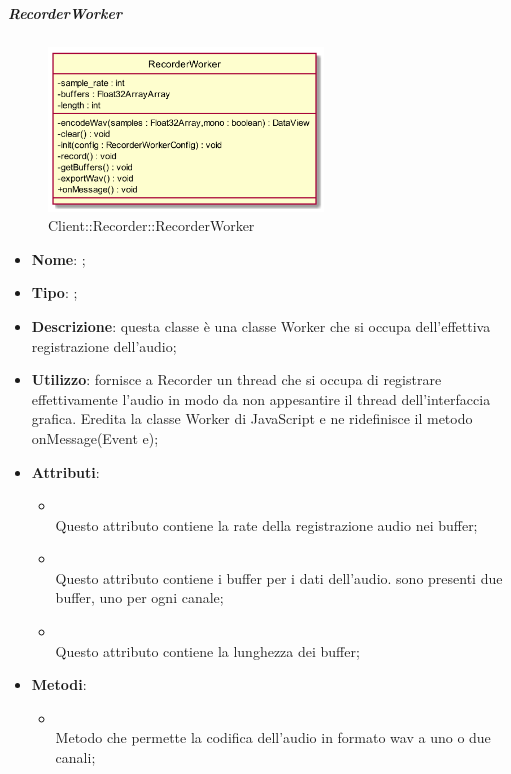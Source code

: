 \hypertarget{RecorderWorker_label}{\subparagraph{RecorderWorker}}
\begin{figure}[h]
	\centering
	\includegraphics[width=0.65\textwidth,height=\textheight,keepaspectratio]{images/ClassRecorderWorker.png}
	\caption{Client::Recorder::RecorderWorker}
\end{figure}
\begin{itemize}
	\item \textbf{Nome}: ;
	\item \textbf{Tipo}: ;
	\item \textbf{Descrizione}: questa classe è una classe Worker che si occupa dell'effettiva registrazione dell'audio;
	\item \textbf{Utilizzo}: fornisce a Recorder un thread che si occupa di registrare effettivamente l'audio in modo da non appesantire il thread dell'interfaccia grafica.
Eredita la classe Worker di JavaScript e ne ridefinisce il metodo onMessage(Event e);
	\item \textbf{Attributi}:
	\begin{itemize}
		\item[]  \\
		Questo attributo contiene la  rate della registrazione audio nei buffer;
		\item[]  \\
		Questo attributo contiene i buffer per i dati dell'audio. sono presenti due buffer, uno per ogni canale;
		\item[]  \\
		Questo attributo contiene la lunghezza dei buffer;
	\end{itemize}
	\item \textbf{Metodi}:
	\begin{itemize}
		\item[]  \\		Metodo che permette la codifica dell'audio in formato wav a uno o due canali;\\

\end{itemize}
\end{itemize}
